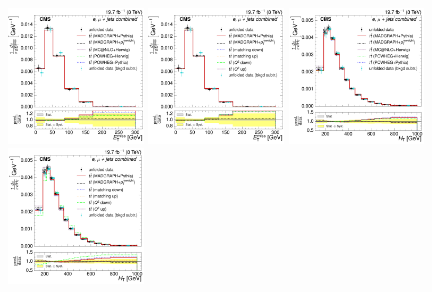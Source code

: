 \begin{figure}[hbtp]
    \centering
     \includegraphics[width=0.32\textwidth]{Chapters/04_Analysis/04b_XSections/images/results/fit/8TeV/MET/central/normalised_xsection_combined_different_generators_with_bkgd_subtraction_results.pdf}\hfill
     \includegraphics[width=0.32\textwidth]{Chapters/04_Analysis/04b_XSections/images/results/fit/8TeV/MET/central/normalised_xsection_combined_systematics_shifts_with_bkgd_subtraction_results.pdf}\hfill
     \includegraphics[width=0.32\textwidth]{Chapters/04_Analysis/04b_XSections/images/results/fit/8TeV/HT/central/normalised_xsection_combined_different_generators_with_bkgd_subtraction_results.pdf}\\
     \includegraphics[width=0.32\textwidth]{Chapters/04_Analysis/04b_XSections/images/results/fit/8TeV/HT/central/normalised_xsection_combined_systematics_shifts_with_bkgd_subtraction_results.pdf}\hfill

\end{figure}
